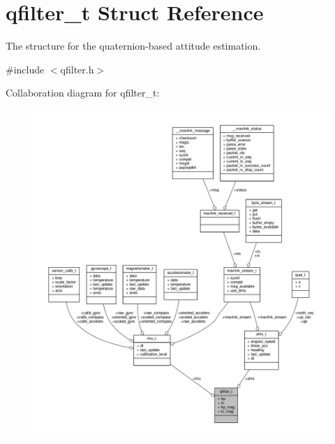 \hypertarget{structqfilter__t}{\section{qfilter\+\_\+t Struct Reference}
\label{structqfilter__t}
}


The structure for the quaternion-\/based attitude estimation.  




{\ttfamily \#include $<$qfilter.\+h$>$}



Collaboration diagram for qfilter\+\_\+t\+:
\nopagebreak
\begin{figure}[H]
\begin{center}
\leavevmode
\includegraphics[width=350pt]{structqfilter__t__coll__graph}
\end{center}
\end{figure}
